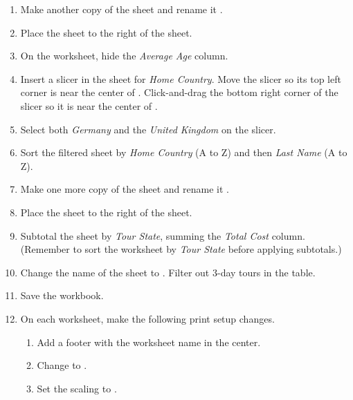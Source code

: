 \begin{enumerate}
	\item Make another copy of the  sheet and rename it . 
	\item Place the  sheet to the right of the  sheet. 
	\item On the  worksheet, hide the \textit{Average Age} column.
	\item Insert a slicer in the  sheet for \textit{Home Country}. Move the slicer so its top left corner is near the center of . Click-and-drag the bottom right corner of the slicer so it is near the center of .
	\item Select both \textit{Germany} and the \textit{United Kingdom} on the slicer.
	\item Sort the filtered sheet by \textit{Home Country} (A to Z) and then \textit{Last Name} (A to Z).

	\item Make one more copy of the  sheet and rename it .
	\item Place the  sheet to the right of the  sheet. 
	\item Subtotal the sheet by \textit{Tour State}, summing the \textit{Total Cost} column. (Remember to sort the worksheet by \textit{Tour State} before applying subtotals.)
	\item Change the name of the  sheet to . Filter out $ 3 $-day tours in the table.
	\item Save the  workbook.
	\item On each worksheet, make the following print setup changes.

	\begin{enumerate}
		\item Add a footer with the worksheet name in the center.
		\item Change to .
		\item Set the scaling to .
	\end{enumerate}


\end{enumerate}
